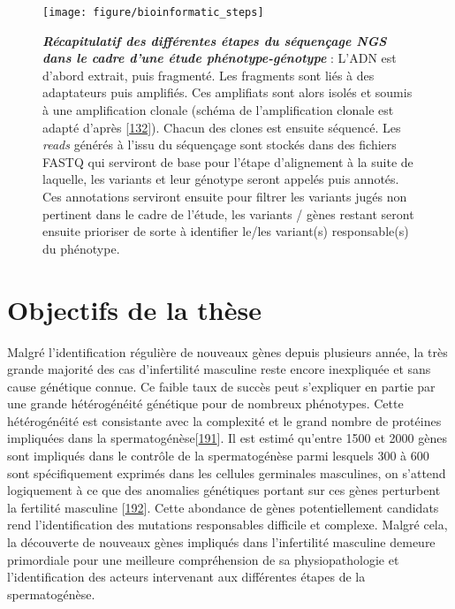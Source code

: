 \documentclass[12pt,a4paper,twoside]{ugathesis}
\theoremstyle{definition}
\theoremstyle{definition}
\theoremstyle{definition}
\theoremstyle{remark}
\begin{document}
\newpage 

\begin{figure}

{\centering \texttt{[image: figure/bioinformatic\_steps]} 

}

\caption[Récapitulatif des différentes étapes du séquençage NGS dans le cadre d'une étude phénotype-génotype]{\textbf{\emph{Récapitulatif des différentes
étapes du séquençage NGS dans le cadre d'une étude phénotype-génotype}}
: L'ADN est d'abord extrait, puis fragmenté. Les fragments sont liés à
des adaptateurs puis amplifiés. Ces amplifiats sont alors isolés et
soumis à une amplification clonale (schéma de l'amplification clonale
est adapté d'après {[}\protect\hyperlink{ref-Goodwin2016}{132}{]}).
Chacun des clones est ensuite séquencé. Les \emph{reads} générés à
l'issu du séquençage sont stockés dans des fichiers FASTQ qui serviront
de base pour l'étape d'alignement à la suite de laquelle, les variants
et leur génotype seront appelés puis annotés. Ces annotations serviront
ensuite pour filtrer les variants jugés non pertinent dans le cadre de
l'étude, les variants / gènes restant seront ensuite prioriser de sorte
à identifier le/les variant(s) responsable(s) du phénotype.}\label{fig:pictrecapngssteps}
\end{figure}















\chapter*{Objectifs de la thèse}\label{objectifs-de-la-these}

Malgré l'identification régulière de nouveaux gènes depuis plusieurs
année, la très grande majorité des cas d'infertilité masculine reste
encore inexpliquée et sans cause génétique connue. Ce faible taux de
succès peut s'expliquer en partie par une grande hétérogénéité génétique
pour de nombreux phénotypes. Cette hétérogénéité est consistante avec la
complexité et le grand nombre de protéines impliquées dans la
spermatogénèse{[}\protect\hyperlink{ref-wistuba2007mammalian}{191}{]}.
Il est estimé qu'entre 1500 et 2000 gènes sont impliqués dans le
contrôle de la spermatogénèse parmi lesquels 300 à 600 sont
spécifiquement exprimés dans les cellules germinales masculines, on
s'attend logiquement à ce que des anomalies génétiques portant sur ces
gènes perturbent la fertilité masculine
{[}\protect\hyperlink{ref-Matzuk2008}{192}{]}. Cette abondance de gènes
potentiellement candidats rend l'identification des mutations
responsables difficile et complexe. Malgré cela, la découverte de
nouveaux gènes impliqués dans l'infertilité masculine demeure
primordiale pour une meilleure compréhension de sa physiopathologie et
l'identification des acteurs intervenant aux différentes étapes de la
spermatogénèse.
\end{document}

